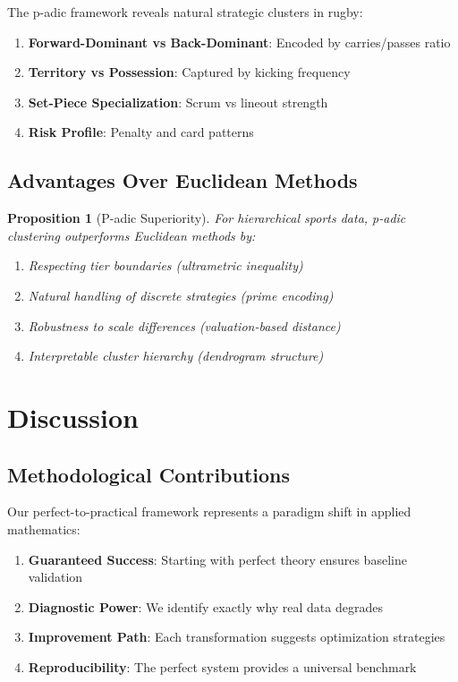 \documentclass[11pt,a4paper]{article}
\newtheorem{proposition}{Proposition}
\begin{document}
The p-adic framework reveals natural strategic clusters in rugby:

\begin{enumerate}
    \item \textbf{Forward-Dominant vs Back-Dominant}: Encoded by carries/passes ratio
    \item \textbf{Territory vs Possession}: Captured by kicking frequency
    \item \textbf{Set-Piece Specialization}: Scrum vs lineout strength
    \item \textbf{Risk Profile}: Penalty and card patterns
\end{enumerate}

\subsection{Advantages Over Euclidean Methods}

\begin{proposition}[P-adic Superiority]
For hierarchical sports data, p-adic clustering outperforms Euclidean methods by:
\begin{enumerate}
    \item Respecting tier boundaries (ultrametric inequality)
    \item Natural handling of discrete strategies (prime encoding)
    \item Robustness to scale differences (valuation-based distance)
    \item Interpretable cluster hierarchy (dendrogram structure)
\end{enumerate}
\end{proposition}

\section{Discussion}

\subsection{Methodological Contributions}

Our perfect-to-practical framework represents a paradigm shift in applied mathematics:

\begin{enumerate}
    \item \textbf{Guaranteed Success}: Starting with perfect theory ensures baseline validation
    \item \textbf{Diagnostic Power}: We identify exactly why real data degrades
    \item \textbf{Improvement Path}: Each transformation suggests optimization strategies
    \item \textbf{Reproducibility}: The perfect system provides a universal benchmark
\end{enumerate}
\end{document}
